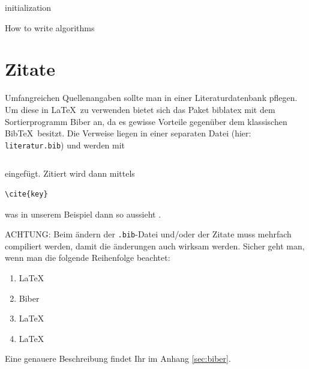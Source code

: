 \documentclass[12pt,DIV=15,BCOR=15mm,twoside,headsepline,abstract=true,listof=totoc,bibliography=totoc]{scrreprt}
\theoremstyle{remark}	%
\begin{document}
\begin{algorithm}[ht]
 initialization\;
 \caption{How to write algorithms}\label{alg:pseudo}
\end{algorithm}


\section{Zitate}
\label{ch:bib}
Umfangreichen Quellenangaben sollte man in einer Literaturdatenbank pflegen. Um diese in \LaTeX\ zu verwenden bietet sich das Paket biblatex mit dem Sortierprogramm
 Biber an, da es gewisse Vorteile gegenüber dem klassischen Bib\TeX\ besitzt. 
Die Verweise liegen in einer separaten Datei (hier: \texttt{literatur.bib}) und werden mit \begin{verbatim}\end{verbatim} eingefügt. %
Zitiert wird dann mittels \begin{verbatim}\cite{key}\end{verbatim} was in unserem Beispiel dann so aussieht \cite{forster1983analysis}. 

\noindent ACHTUNG: Beim ändern der {\texttt{.bib}}-Datei und/oder der Zitate muss mehrfach compiliert werden, damit die änderungen auch wirksam werden. Sicher geht man, wenn man die folgende Reihenfolge beachtet: 
\begin{enumerate}
 \item \LaTeX
 \item Biber
 \item \LaTeX
 \item \LaTeX
\end{enumerate}

Eine genauere Beschreibung findet Ihr im Anhang \ref{sec:biber}.
\appendix

\printbibliography %


\eigenstaenigkeitserklaerung
\end{document}
